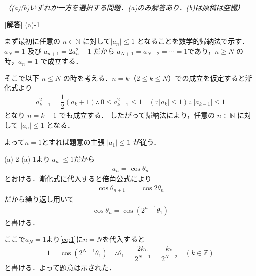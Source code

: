 \documentclass[../../main.tex]{subfiles}
\begin{document}
\begin{oframed}
  
\end{oframed}

\begin{flushright}
  \footnotesize\textit{（(a)(b)いずれか一方を選択する問題．(a)のみ解答あり．(b)は原稿は空欄）}
\end{flushright}

{\bf [解答]}
(a)-1

まず最初に任意の $n\in\mathbb{N}$ に対して$|a_n|\le1$ となることを数学的帰納法で示す．
$a_N=1$ 及び $a_{n+1}=2a_n^2-1$ だから $a_{N+1}=a_{N+2}=\cdots = 1$であり，$n\ge N$ の時，$a_n=1$ で成立する．

そこで以下 $n\le N$ の時を考える．$n=k$（$2\le k\le N$）での成立を仮定すると漸化式より
\begin{align}
  a_{k-1}^2=\dfrac{1}{2}(a_k+1)
  \therefore\
  0\le a_{k-1}^2\le 1 \quad (\because|a_k|\le 1)
  \therefore\
  |a_{k-1}|\le 1
\end{align}
となり $n=k-1$ でも成立する．
したがって帰納法により，任意の $n\in\mathbb{N}$ に対して $|a_n|\le 1$ となる．

よって$n=1$とすれば題意の主張 $|a_1|\le 1$ が従う．

(a)-2
(a)-1より$|a_n|\le 1$だから
\begin{align}
  a_n=\cos\theta_n
\end{align}
とおける．漸化式に代入すると倍角公式により
\begin{align}
  \cos\theta_{n+1} &=\cos2\theta_n
\end{align}
だから繰り返し用いて
\begin{align}
  \cos\theta_{n} = \cos \left(2^{n-1}\theta_1\right) \label{eq:1}
\end{align}
と書ける．%

ここで$a_N=1$より\cref{eq:1}に$n=N$を代入すると
\begin{align}
  1 = \cos \left(2^{N-1}\theta_1\right)
  \quad \therefore
  \theta_1=\dfrac{2k\pi}{2^{N-1}}=\dfrac{k\pi}{2^{N-2}}
  \quad (k \in\mathbb{Z})
\end{align}
と書ける．よって題意は示された．
\end{document}
